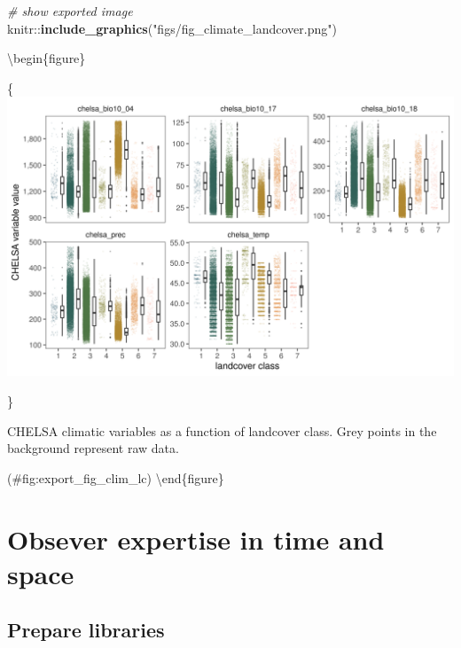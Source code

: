 \documentclass[]{article}
\newenvironment{Shaded}{}{}
\newcommand{\CommentTok}[1]{\textcolor[rgb]{0.38,0.63,0.69}{\textit{#1}}}
\newcommand{\KeywordTok}[1]{\textcolor[rgb]{0.00,0.44,0.13}{\textbf{#1}}}
\newcommand{\NormalTok}[1]{#1}
\newcommand{\OperatorTok}[1]{\textcolor[rgb]{0.40,0.40,0.40}{#1}}
\newcommand{\StringTok}[1]{\textcolor[rgb]{0.25,0.44,0.63}{#1}}
\begin{document}
\begin{Shaded}
\begin{Highlighting}[]

\CommentTok{# show exported image}
\NormalTok{knitr}\OperatorTok{::}\KeywordTok{include_graphics}\NormalTok{(}\StringTok{"figs/fig_climate_landcover.png"}\NormalTok{)}
\end{Highlighting}
\end{Shaded}

\textbackslash{}begin\{figure\}

\{\centering \includegraphics[width=\textwidth]{figs/fig_climate_landcover}

\}

\caption{CHELSA climatic variables as a function of landcover class. Grey points in the background represent raw data.}

(\#fig:export\_fig\_clim\_lc)
\textbackslash{}end\{figure\}

\hypertarget{obsever-expertise-in-time-and-space}{%
\section{Obsever expertise in time and space}\label{obsever-expertise-in-time-and-space}}

\hypertarget{prepare-libraries-4}{%
\subsection{Prepare libraries}\label{prepare-libraries-4}}
\end{document}
